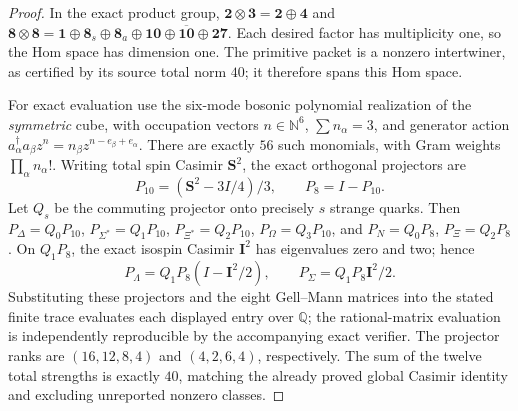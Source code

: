 \documentclass[12pt,a4paper]{article}
\begin{document}
\begin{proof}
In the exact product group,
$\mathbf2\otimes\mathbf3=\mathbf2\oplus\mathbf4$ and
$\mathbf8\otimes\mathbf8=\mathbf1\oplus\mathbf8_s
\oplus\mathbf8_a\oplus\mathbf{10}\oplus\overline{\mathbf{10}}
\oplus\mathbf{27}$. Each desired factor has multiplicity one,
so the Hom space has dimension one.  The primitive packet is a
nonzero intertwiner, as certified by its source total norm $40$;
it therefore spans this Hom space.

For exact evaluation use the six-mode bosonic polynomial realization
of the \emph{symmetric} cube, with occupation vectors
$n\in\mathbb N^6$, $\sum n_\alpha=3$, and generator action
$a^\dagger_\alpha a_\beta z^n=n_\beta
z^{n-e_\beta+e_\alpha}$.  There are exactly $56$ such
monomials, with Gram weights $\prod_\alpha n_\alpha!$.
Writing total spin Casimir $\mathbf S^2$, the exact orthogonal
projectors are
\[
 P_{10}=(\mathbf S^2-3I/4)/3,\qquad P_8=I-P_{10}.
\]
Let $Q_s$ be the commuting projector onto precisely $s$ strange
quarks.  Then $P_\Delta=Q_0P_{10}$,
$P_{\Sigma^*}=Q_1P_{10}$, $P_{\Xi^*}=Q_2P_{10}$,
$P_\Omega=Q_3P_{10}$, and $P_N=Q_0P_8$,
$P_\Xi=Q_2P_8$.  On $Q_1P_8$, the exact isospin
Casimir $\mathbf I^2$ has eigenvalues zero and two; hence
\[
 P_\Lambda=Q_1P_8(I-\mathbf I^2/2),\qquad
 P_\Sigma=Q_1P_8\mathbf I^2/2.
\]
Substituting these projectors and the eight Gell--Mann matrices
into the stated finite trace evaluates each displayed entry over
$\mathbb Q$; the rational-matrix evaluation is independently
reproducible by the accompanying exact verifier.  The projector
ranks are $(16,12,8,4)$ and $(4,2,6,4)$, respectively.  The
sum of the twelve total strengths is exactly $40$, matching the
already proved global Casimir identity and excluding unreported
nonzero classes.
\end{proof}
\end{document}
